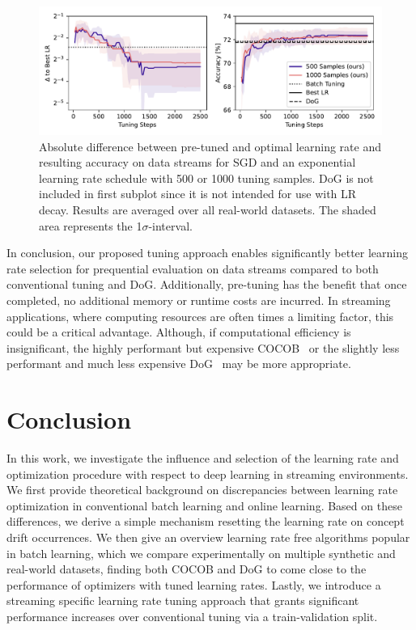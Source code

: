 \documentclass[runningheads]{llncs}
\begin{document}
\begin{figure}[hb]
	\centering
	\includegraphics[width=\textwidth]{figures/pretune_1x64_acc_lr_exp_schedule.pdf}
	\caption{Absolute difference between pre-tuned and optimal learning rate and resulting accuracy on data streams for SGD and an exponential learning rate schedule with 500 or 1000 tuning samples. DoG is not included in first subplot since it is not intended for use with LR decay. Results are averaged over all real-world datasets. The shaded area represents the 1$\sigma$-interval.}\label{fig:pretune_lr_accuracy}
\end{figure}

In conclusion, our proposed tuning approach enables significantly better learning rate selection for prequential evaluation on data streams compared to both conventional tuning and DoG.
Additionally, pre-tuning has the benefit that once completed, no additional memory or runtime costs are incurred.
In streaming applications, where computing resources are often times a limiting factor, this could be a critical advantage.
Although, if computational efficiency is insignificant, the highly performant but expensive COCOB~\cite{orabonaTrainingDeepNetworks2017} or the slightly less performant and much less expensive DoG~\cite{ivgiDoGSGDBest2023} may be more appropriate.


\section{Conclusion}

In this work, we investigate the influence and selection of the learning rate and optimization procedure with respect to deep learning in streaming environments.
We first provide theoretical background on discrepancies between learning rate optimization in conventional batch learning and online learning.
Based on these differences, we derive a simple mechanism resetting the learning rate on concept drift occurrences.
We then give an overview learning rate free algorithms popular in batch learning, which we compare experimentally on multiple synthetic and real-world datasets,
finding both COCOB and DoG to come close to the performance of optimizers with tuned learning rates.
Lastly, we introduce a streaming specific learning rate tuning approach that grants significant performance increases over conventional tuning via a train-validation split.


\printbibliography
\end{document}
